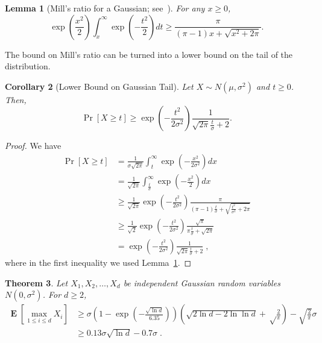 \documentclass{article}
\DeclareMathOperator*{\Exp}{\mathbf{E}}
\newtheorem{theorem}{Theorem}
\newtheorem{lemma}[theorem]{Lemma}
\newtheorem{corrollary}[theorem]{Corollary}
\begin{document}
\begin{lemma}[Mill's ratio for a Gaussian; see~\cite{Boyd-1959}]
\label{lemma:boyd}
For any $x \ge 0$,
\[
\exp\left(\frac{x^2}{2}\right) \int_x^{\infty} \exp\left(-\frac{t^2}{2}\right) dt
\ge \frac{\pi}{(\pi-1)x+\sqrt{x^2+2 \pi}}.
\]
\end{lemma}

The bound on Mill's ratio can be turned into a lower bound on the tail of the distribution.

\begin{corrollary}[Lower Bound on Gaussian Tail]
Let $X \sim N(\mu, \sigma^2)$ and $t \ge 0$. Then,
$$
\Pr[X \ge t] \ge \exp\left(-\frac{t^2}{2 \sigma^2}\right) \frac{1}{\sqrt{2\pi}\frac{t}{\sigma}+2}.
$$
\end{corrollary}

\begin{proof}
We have
\begin{align*}
\Pr[X \ge t]
& = \frac{1}{\sigma \sqrt{2 \pi}} \int_t^{\infty} \exp \left( -\frac{x^2}{2 \sigma^2} \right) d x \\
& = \frac{1}{\sqrt{2 \pi}} \int_\frac{t}{\sigma}^{\infty} \exp \left( -\frac{x^2}{2} \right) d x \\
& \ge \frac{1}{\sqrt{2 \pi}} \exp\left(-\frac{t^2}{2 \sigma^2}\right) \frac{\pi}{(\pi-1)\frac{t}{\sigma}+\sqrt{\frac{t^2}{\sigma^2}+2 \pi}} \\
& \ge \frac{1}{\sqrt{2}} \exp\left(-\frac{t^2}{2 \sigma^2}\right) \frac{\sqrt{\pi}}{\pi\frac{t}{\sigma}+\sqrt{2 \pi}} \\
& = \exp\left(-\frac{t^2}{2 \sigma^2}\right) \frac{1}{\sqrt{2\pi}\frac{t}{\sigma}+2} \; ,
\end{align*}
where in the first inequality we used Lemma~\ref{lemma:boyd}.
\end{proof}

\begin{theorem}
Let $X_1, X_2, \dots, X_d$ be independent Gaussian random variables $N(0,\sigma^2)$. For $d \ge 2$,
\begin{align}
\Exp \left[\max_{1 \le i \le d} X_i\right]
& \ge \sigma \left(1 - \exp\left(-\frac{\sqrt{\ln d}}{6.35}\right)\right) \left(\sqrt{2 \ln d - 2 \ln \ln d} +\sqrt\frac{2}{\pi}\right) -\sqrt{\frac{2}{\pi}} \sigma \label{equation:maximum-of-gaussians-lower-bound-1} \\
& \ge 0.13 \sigma \sqrt{\ln d} - 0.7 \sigma \label{equation:maximum-of-gaussians-lower-bound-2} \; .
\end{align}
\end{theorem}
\end{document}
